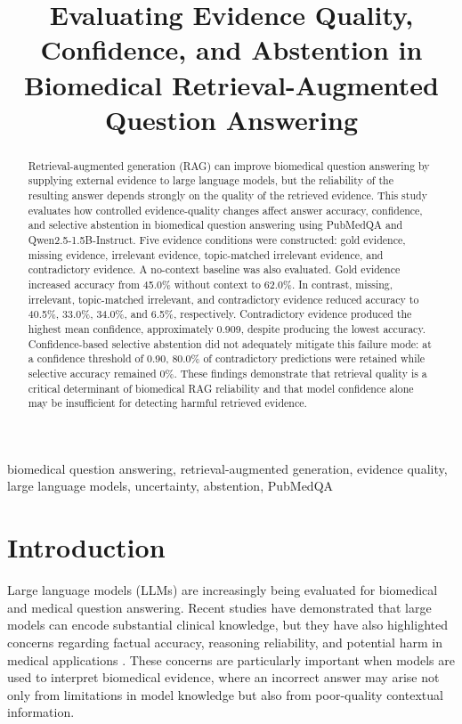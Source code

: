 \documentclass[conference]{IEEEtran}
\title{Evaluating Evidence Quality, Confidence, and Abstention in Biomedical Retrieval-Augmented Question Answering}
\author{
\IEEEauthorblockN{Tharuniya Anpalakan}
\IEEEauthorblockA{
Department of Applied Sciences\\
Northumbria University\\
Newcastle upon Tyne, United Kingdom\\
w25070895@northumbria.ac.lk
}
}
\begin{document}
\maketitle

\begin{abstract}
Retrieval-augmented generation (RAG) can improve biomedical question answering by supplying external evidence to large language models, but the reliability of the resulting answer depends strongly on the quality of the retrieved evidence. This study evaluates how controlled evidence-quality changes affect answer accuracy, confidence, and selective abstention in biomedical question answering using PubMedQA and Qwen2.5-1.5B-Instruct. Five evidence conditions were constructed: gold evidence, missing evidence, irrelevant evidence, topic-matched irrelevant evidence, and contradictory evidence. A no-context baseline was also evaluated. Gold evidence increased accuracy from 45.0\% without context to 62.0\%. In contrast, missing, irrelevant, topic-matched irrelevant, and contradictory evidence reduced accuracy to 40.5\%, 33.0\%, 34.0\%, and 6.5\%, respectively. Contradictory evidence produced the highest mean confidence, approximately 0.909, despite producing the lowest accuracy. Confidence-based selective abstention did not adequately mitigate this failure mode: at a confidence threshold of 0.90, 80.0\% of contradictory predictions were retained while selective accuracy remained 0\%. These findings demonstrate that retrieval quality is a critical determinant of biomedical RAG reliability and that model confidence alone may be insufficient for detecting harmful retrieved evidence.
\end{abstract}

\begin{IEEEkeywords}
biomedical question answering, retrieval-augmented generation, evidence quality, large language models, uncertainty, abstention, PubMedQA
\end{IEEEkeywords}

\section{Introduction}

Large language models (LLMs) are increasingly being evaluated for biomedical and medical question answering. Recent studies have demonstrated that large models can encode substantial clinical knowledge, but they have also highlighted concerns regarding factual accuracy, reasoning reliability, and potential harm in medical applications \cite{singhal2023clinical}. These concerns are particularly important when models are used to interpret biomedical evidence, where an incorrect answer may arise not only from limitations in model knowledge but also from poor-quality contextual information.
\end{document}
